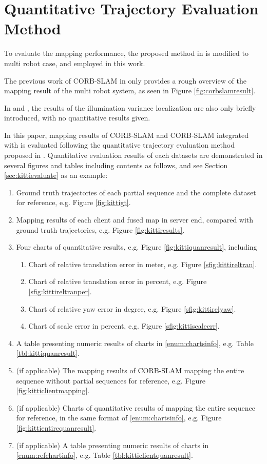 \section{Quantitative Trajectory Evaluation Method}
To evaluate the mapping performance, the proposed method in \cite{zhang2018tutorial} is modified to multi robot case, and employed in this work.

The previous work of CORB-SLAM in \cite{li2017corb} only provides a rough overview of the mapping result of the multi robot system, as seen in Figure \ref{fig:corbslamresult}.

In \cite{maddern2014illumination} and \cite{arroyo2016openable}, the results of the illumination variance localization are also only briefly introduced, with no quantitative results given.

 In this paper, mapping results of CORB-SLAM and CORB-SLAM integrated with  is evaluated following the quantitative trajectory evaluation method proposed in \cite{zhang2018tutorial}. Quantitative evaluation results of each datasets are demonstrated in several figures and tables including contents as follows, and see Section \ref{sec:kittievaluate} as an example: 
 
 \begin{enumerate}[1.]
 	\item Ground truth trajectories of each partial sequence and the complete dataset for reference, e.g. Figure \ref{fig:kittigt}.
 	\item Mapping results of each client and fused map in server end, compared with ground truth trajectories, e.g. Figure \ref{fig:kittiresults}.
 	\item Four charts of quantitative results, e.g. Figure \ref{fig:kittiquanresult}, including 
 	\label{enum:chartsinfo}
 		\begin{enumerate}[1).]
 			\item Chart of relative translation error in meter, e.g. Figure \ref{sfig:kittireltran}.
 			\item Chart of relative translation error in percent, e.g. Figure \ref{sfig:kittireltranper}.
 			\item Chart of relative yaw error in degree, e.g. Figure \ref{sfig:kittirelyaw}.
 			\item Chart of scale error in percent, e.g. Figure \ref{sfig:kittiscaleerr}.
 		\end{enumerate}
 	\item A table presenting numeric results of charts in \ref{enum:chartsinfo}, e.g. Table \ref{tbl:kittiquanresult}.
 	\item (if applicable) The mapping results of CORB-SLAM mapping the entire sequence without partial sequences for reference, e.g. Figure \ref{fig:kitticlientmapping}.
 	\item (if applicable) Charts of quantitative results of mapping the entire sequence for reference, in the same format of \ref{enum:chartsinfo}, e.g. Figure \ref{fig:kittientirequanresult}.
 	\label{enum:refchartinfo}
 	\item (if applicable) A table presenting numeric results of charts in \ref{enum:refchartinfo}, e.g. Table \ref{tbl:kitticlientquanresult}.
 \end{enumerate}
 
